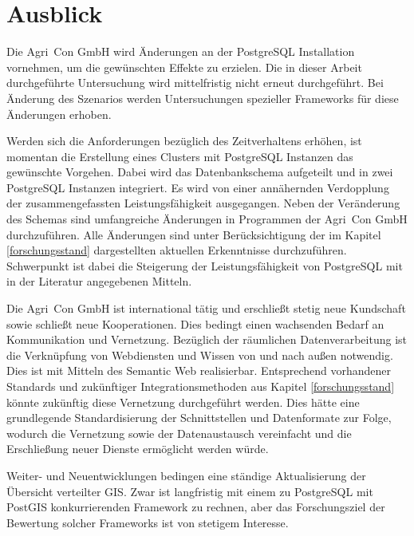 \section{Ausblick}
Die Agri~Con GmbH wird Änderungen an der PostgreSQL Installation vornehmen, um die gewünschten Effekte zu erzielen.
Die in dieser Arbeit durchgeführte Untersuchung wird mittelfristig nicht erneut durchgeführt.
Bei Änderung des Szenarios werden Untersuchungen spezieller Frameworks für diese Änderungen erhoben.

Werden sich die Anforderungen bezüglich des Zeitverhaltens erhöhen, ist momentan die Erstellung eines Clusters mit PostgreSQL Instanzen das gewünschte Vorgehen.
Dabei wird das Datenbankschema aufgeteilt und in zwei PostgreSQL Instanzen integriert.
Es wird von einer annähernden Verdopplung der zusammengefassten Leistungsfähigkeit ausgegangen.
Neben der Veränderung des Schemas sind umfangreiche Änderungen in Programmen der Agri~Con GmbH durchzuführen.
Alle Änderungen sind unter Berücksichtigung der im Kapitel \ref{forschungsstand} dargestellten aktuellen Erkenntnisse durchzuführen.
Schwerpunkt ist dabei die Steigerung der Leistungsfähigkeit von PostgreSQL mit in der Literatur angegebenen Mitteln.

Die Agri~Con GmbH ist international tätig und erschließt stetig neue Kundschaft sowie schließt neue Kooperationen.
Dies bedingt einen wachsenden Bedarf an Kommunikation und Vernetzung.
Bezüglich der räumlichen Datenverarbeitung ist die Verknüpfung von Webdiensten und Wissen von und nach außen notwendig.
Dies ist mit Mitteln des Semantic Web realisierbar.
Entsprechend vorhandener Standards und zukünftiger Integrationsmethoden aus Kapitel \ref{forschungsstand} könnte zukünftig diese Vernetzung durchgeführt werden.
Dies hätte eine grundlegende Standardisierung der Schnittstellen und Datenformate zur Folge, wodurch die Vernetzung sowie der Datenaustausch vereinfacht und die Erschließung neuer Dienste ermöglicht werden würde.

Weiter- und Neuentwicklungen bedingen eine ständige Aktualisierung der Übersicht verteilter GIS.
Zwar ist langfristig mit einem zu PostgreSQL mit PostGIS konkurrierenden Framework zu rechnen, aber das Forschungsziel der Bewertung solcher Frameworks ist von stetigem Interesse.

\label{LastPage}